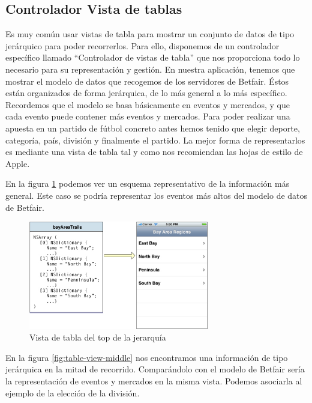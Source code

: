  \subsection{Controlador Vista de tablas}	

  Es muy común usar vistas de tabla para mostrar un conjunto de datos de tipo jerárquico para poder recorrerlos.  
  Para ello, disponemos de un controlador específico llamado ``Controlador de vistas de tabla'' que nos proporciona todo lo necesario para su representación y gestión. En nuestra aplicación, tenemos que mostrar el modelo de datos que recogemos de los servidores de Betfair. Éstos están organizados de forma jerárquica, de lo más general a lo más específico. Recordemos que el modelo se basa básicamente en eventos y mercados, y que cada evento puede contener más eventos y mercados. Para poder realizar una apuesta en un partido de fútbol concreto antes hemos tenido que elegir deporte, categoría, país, división y finalmente el partido. La mejor forma de representarlos es mediante una vista de tabla tal y como nos recomiendan las hojas de estilo de Apple.
  
   En la figura \ref{fig:table-view-top} podemos ver un esquema representativo de la información más general. Este caso se podría representar los eventos más altos del modelo de datos de Betfair.
  
 \begin{figure}[h!]
  \centering
    \includegraphics[width=0.7\textwidth]{./images/tv_datamodel_top.jpg}
  \caption{Vista de tabla del top de la jerarquía }
  \label{fig:table-view-top}
\end{figure} 

 En la figura \ref{fig:table-view-middle} nos encontramos una información de tipo jerárquica en la mitad de recorrido. Comparándolo con el modelo de Betfair sería la representación de eventos y mercados en la misma vista. Podemos asociarla al ejemplo de la elección de la división.

